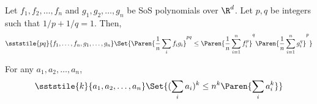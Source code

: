 \begin{fact}
Let $f_1, f_2, \ldots, f_n$ and $g_1, g_2, \ldots, g_n$ be SoS polynomials over $\R^d$. Let $p, q$ be integers such that $1/p + 1/q = 1$. Then, 
\[
\sststile{pq}{f_1, \ldots, f_n,g_1, \ldots, g_n} \Set{ \Paren{\frac{1}{n} \sum_{i} f_i g_i }^{pq} \leq \Paren{\frac{1}{n} \sum_{i=1}^n f_i^p}^q \Paren{\frac{1}{n} \sum_{i=1}^n g_i^q}^p }
\]

\end{fact}
\begin{fact}
For any $a_1, a_2,\ldots,a_n$, 
\[
\sststile{k}{a_1, a_2, \ldots, a_n} \Set{ (\sum_i a_i)^k \leq n^k \Paren{\sum_i a_i^k} } 
\]
\end{fact}







